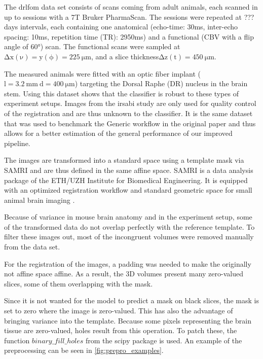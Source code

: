 The drlfom data set consists of  scans coming from  adult animals, each scanned in up to  sessions with a 7T Bruker PharmaScan.
The sessions were repeated at ??? days intervals, each containing one anatomical (echo-time: 30ms, inter-echo spacing: 10ms, repetition time (TR): 2950ms) and a functional (CBV with a flip angle of 60°) scan.
The functional scans were sampled at $\mathrm{\Delta x(\nu)=y(\phi)=\SI{225}{\micro\meter}}$, and a slice thickness$\mathrm{\Delta z(t)=\SI{450}{\micro\meter}}$.

The measured animals were fitted with an optic fiber implant ($\mathrm{l=\SI{3.2}{\milli\meter} \ d=\SI{400}{\micro\meter}}$) targeting the Dorsal Raphe (DR) nucleus in the brain stem.
Using this dataset shows that the classifier is robust to these types of experiment setups.
Images from the irsabi study are only used for quality control of the registration and are thus unknown to the classifier.
It is the same dataset that was used to benchmark the Generic workflow in the original paper and thus allows for a better estimation of the general performance of our improved pipeline.

The images are transformed into a standard space using a template mask via SAMRI \cite{noauthor_ibt-fmi/samri_2019} and are thus defined in the same affine space.
SAMRI is a data analysis package of the ETH/UZH Institute for Biomedical Engineering.
It is equipped with an optimized registration workflow and standard geometric space for small animal brain imaging \cite{ioanas_optimized_2019}.

Because of variance in mouse brain anatomy and in the experiment setup, some of the transformed data do not overlap perfectly with the reference template.
To filter these images out, most of the incongruent volumes were removed manually from the data set.

For the registration of the images, a padding was needed to make the originally not affine space affine.
As a result, the 3D volumes present many zero-valued slices, some of them overlapping with the mask.

Since it is not wanted for the model to predict a mask on black slices, the mask is set to zero where the image is zero-valued.
This has also the advantage of bringing variance into the template.
Because some pixels representing the brain tissue are zero-valued, holes result from this operation.
To patch these, the function \textcolor{mg}{\texttt{$binary\_fill\_holes$}} from the scipy \cite{2020SciPy-NMeth} package is used.
An example of the preprocessing can be seen in \cref{fig:prepro_examples}.


